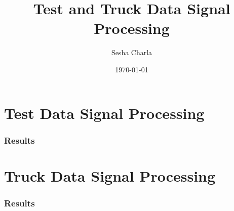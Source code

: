 \documentclass[letterpaper, 11pt]{article}
\title{Test and Truck Data Signal Processing}
\author{Sesha Charla}
\date{\today}
\begin{document}
\maketitle
\tableofcontents
\newpage

\newpage
\part{Test Data Signal Processing}

\section{Results}
\newpage
\part{Truck Data Signal Processing}

\section{Results}
\end{document}
